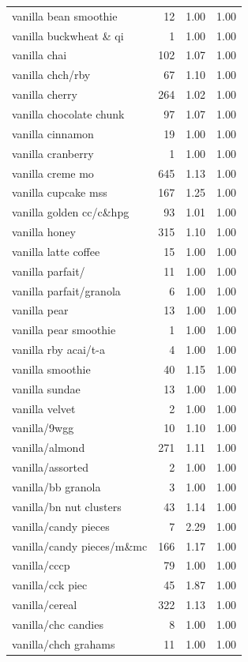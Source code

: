 \begin{table}
\begin{tabular}{lrrr}
vanilla bean smoothie & 12 & 1.00 & 1.00 \\
vanilla buckwheat \& qi & 1 & 1.00 & 1.00 \\
vanilla chai & 102 & 1.07 & 1.00 \\
vanilla chch/rby & 67 & 1.10 & 1.00 \\
vanilla cherry & 264 & 1.02 & 1.00 \\
vanilla chocolate chunk & 97 & 1.07 & 1.00 \\
vanilla cinnamon & 19 & 1.00 & 1.00 \\
vanilla cranberry & 1 & 1.00 & 1.00 \\
vanilla creme mo & 645 & 1.13 & 1.00 \\
vanilla cupcake mss & 167 & 1.25 & 1.00 \\
vanilla golden cc/c\&hpg & 93 & 1.01 & 1.00 \\
vanilla honey & 315 & 1.10 & 1.00 \\
vanilla latte coffee & 15 & 1.00 & 1.00 \\
vanilla parfait/ & 11 & 1.00 & 1.00 \\
vanilla parfait/granola & 6 & 1.00 & 1.00 \\
vanilla pear & 13 & 1.00 & 1.00 \\
vanilla pear smoothie & 1 & 1.00 & 1.00 \\
vanilla rby acai/t-a & 4 & 1.00 & 1.00 \\
vanilla smoothie & 40 & 1.15 & 1.00 \\
vanilla sundae & 13 & 1.00 & 1.00 \\
vanilla velvet & 2 & 1.00 & 1.00 \\
vanilla/9wgg & 10 & 1.10 & 1.00 \\
vanilla/almond & 271 & 1.11 & 1.00 \\
vanilla/assorted & 2 & 1.00 & 1.00 \\
vanilla/bb granola & 3 & 1.00 & 1.00 \\
vanilla/bn nut clusters & 43 & 1.14 & 1.00 \\
vanilla/candy pieces & 7 & 2.29 & 1.00 \\
vanilla/candy pieces/m\&mc & 166 & 1.17 & 1.00 \\
vanilla/cccp & 79 & 1.00 & 1.00 \\
vanilla/cck piec & 45 & 1.87 & 1.00 \\
vanilla/cereal & 322 & 1.13 & 1.00 \\
vanilla/chc candies & 8 & 1.00 & 1.00 \\
vanilla/chch grahams & 11 & 1.00 & 1.00 \\

\end{tabular}
\end{table}
